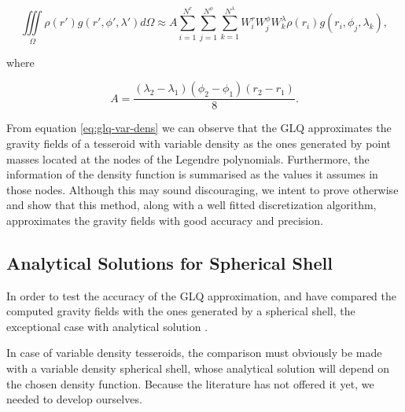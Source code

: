 \documentclass[extra]{gji}
\begin{document}
{
\begin{equation}
    \iiint\limits_\Omega \rho(r') g(r', \phi', \lambda') d\Omega \approx
    A 
    \sum\limits_{i=1}^{N^r}
    \sum\limits_{j=1}^{N^\phi}
    \sum\limits_{k=1}^{N^\lambda}
    W_i^r W_j^\phi W_k^\lambda \rho(r_i) g(r_i, \phi_j, \lambda_k),
\label{eq:glq-var-dens}
\end{equation}
}

\noindent where

\begin{equation}
    A = 
    \frac{(\lambda_2 - \lambda_1)(\phi_2 - \phi_1)(r_2 - r_1)}{8}.
\end{equation}

From equation \ref{eq:glq-var-dens} we can observe that the GLQ approximates the gravity fields of a tesseroid with variable density as the ones generated by point masses located at the nodes of the Legendre polynomials.
Furthermore, the information of the density function is summarised as the values it assumes in those nodes.
Although this may sound discouraging, we intent to prove otherwise and show that this method, along with a well fitted discretization algorithm, approximates the gravity fields with good accuracy and precision.


\subsection{Analytical Solutions for Spherical Shell}

In order to test the accuracy of the GLQ approximation, \citet{Uieda2016} and \citet{Grombein2013} have compared the computed gravity fields with the ones generated by a spherical shell, the exceptional case with analytical solution \citep{Mikuska2006,Grombein2013}.

In case of variable density tesseroids, the comparison must obviously be made with a variable density spherical shell, whose analytical solution will depend on the chosen density function.
Because the literature has not offered it yet, we needed to develop ourselves.
\end{document}
